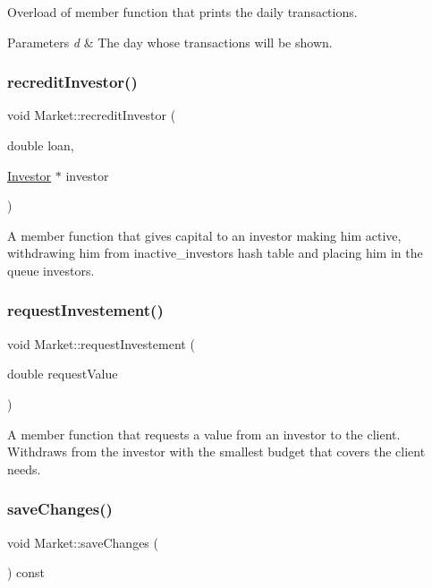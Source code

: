 Overload of member function that prints the daily transactions. 
\begin{DoxyParams}{Parameters}
{\em d} & The day whose transactions will be shown. \\
\hline
\end{DoxyParams}
\mbox{\label{class_market_ae96d55536785e519ebff6353d489471e}} 
\subsubsection{\texorpdfstring{recredit\+Investor()}{recreditInvestor()}}
{\footnotesize\ttfamily void Market\+::recredit\+Investor (\begin{DoxyParamCaption}\item[{double}]{loan,  }\item[{\hyperlink{class_investor}{Investor} $\ast$}]{investor }\end{DoxyParamCaption})}

A member function that gives capital to an investor making him active, withdrawing him from inactive\+\_\+investors hash table and placing him in the queue investors. \mbox{\label{class_market_a9b1ec16d237155f4524179b393994c5d}} 
\subsubsection{\texorpdfstring{request\+Investement()}{requestInvestement()}}
{\footnotesize\ttfamily void Market\+::request\+Investement (\begin{DoxyParamCaption}\item[{double}]{request\+Value }\end{DoxyParamCaption})}

A member function that requests a value from an investor to the client. Withdraws from the investor with the smallest budget that covers the client needs. \mbox{\label{class_market_a02ceb8abf4d9395d3c80c7494c301ac4}} 
\subsubsection{\texorpdfstring{save\+Changes()}{saveChanges()}}
{\footnotesize\ttfamily void Market\+::save\+Changes (\begin{DoxyParamCaption}{ }\end{DoxyParamCaption}) const}

